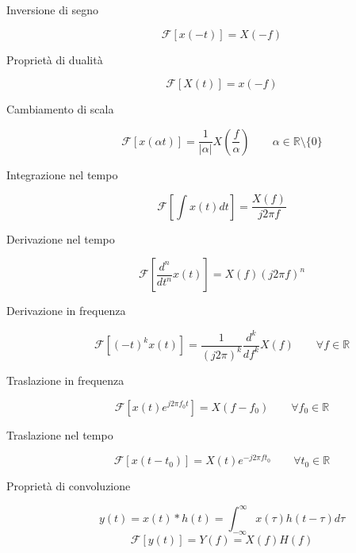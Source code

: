 \documentclass[10pt,a4paper]{article}
\begin{document}
\begin{multicols}{2}
\begin{description}

\item[Inversione di segno]
\begin{equation}
\mathcal{F}[x(-t)] = X(-f)
\end{equation}

\item[Proprietà di dualità]
\begin{equation}
\mathcal{F}[X(t)] = x(-f)
\end{equation}

\item[Cambiamento di scala]
\begin{equation}
\mathcal{F}[x(\alpha t)] = \frac{1}{| \alpha |}X \left( \frac{f}{\alpha} \right) \qquad \alpha \in \mathbb{R} \setminus \{0\}
\end{equation}

\item[Integrazione nel tempo]
\begin{equation}
\mathcal{F} \left[ \int x(t)dt \right] = \dfrac{X(f)}{j2\pi f}
\end{equation}

\columnbreak
\item[Derivazione nel tempo]
\begin{equation}
\mathcal{F} \left[ \frac{d^n}{dt^n} x(t) \right] = X(f)(j 2\pi f)^n
\end{equation}

\item[Derivazione in frequenza]
\begin{equation}
\mathcal{F} [(-t)^kx(t)] = \dfrac{1}{(j2\pi)^k} \frac{d^k}{df^k} X(f) \qquad \forall f \in \mathbb{R}
\end{equation}

\item[Traslazione in frequenza]
\begin{equation}
\mathcal{F} [x(t)e^{j2\pi f_0 t}] = X(f-f_0) \qquad \forall f_0 \in \mathbb{R}
\end{equation}

\item[Traslazione nel tempo]
\begin{equation}
\mathcal{F} [x(t-t_0)] = X(t)e^{-j2\pi f t_0} \qquad \forall t_0 \in \mathbb{R}
\end{equation}

\item[Proprietà di convoluzione]
\begin{equation}
y(t) = x(t) \ast h(t) = \int^{\infty}_{-\infty} x(\tau)h(t-\tau) d\tau
\end{equation}
\begin{equation}
\mathcal{F} [y(t)] = Y(f) = X(f)H(f)
\end{equation}

\end{description}
\end{multicols}
\end{document}
